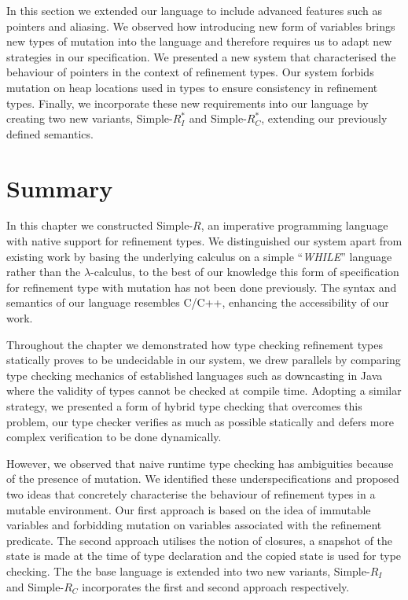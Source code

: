 \documentclass[a4paper,12pt]{report}
\begin{document}
\par
In this section we extended our language to include advanced features such 
as pointers and aliasing. We observed how introducing new form of 
variables brings new types of mutation into the language and therefore 
requires us to adapt new strategies in our specification. We presented  
a new system that characterised the behaviour of pointers in the context of 
refinement types. Our system forbids mutation on heap locations used in types 
to ensure consistency in refinement types. Finally, we incorporate these new requirements 
into our language by creating two new variants, Simple-$R^{*}_{I}$ 
and Simple-$R^{*}_{C}$, extending our previously defined semantics. 

\section{Summary}
In this chapter we constructed Simple-$R$, an imperative programming language with native 
support for refinement types. We distinguished our 
system apart from existing work by basing the underlying calculus 
on a simple ``\textit{WHILE}'' language 
rather than the $\lambda$-calculus, to the best of our knowledge this form of 
specification for refinement type with mutation has not been done 
previously. The syntax and semantics of our 
language resembles C/C++, enhancing the accessibility of our work.

\par
Throughout the chapter we demonstrated how type checking refinement types 
statically proves to be undecidable in our system, we drew parallels by comparing 
type checking mechanics of established languages such as downcasting in Java 
where the validity of types cannot be checked at compile time. 
Adopting a similar strategy, we presented a form of hybrid type checking 
that overcomes this problem, our type checker verifies as much as possible 
statically and defers more complex verification to be done dynamically. 

\par
However, we observed that naive runtime type checking has ambiguities 
because of the presence of mutation. We identified these underspecifications and 
proposed two ideas that concretely characterise the behaviour of refinement 
types in a mutable environment. Our first approach is based on the 
idea of immutable variables and forbidding mutation on variables associated 
with the refinement predicate. The second approach utilises the notion of closures, 
a snapshot of the state is made at the time of type declaration and the copied 
state is used for type checking. The the base language is extended into two 
new variants, Simple-$R_{I}$ and Simple-$R_{C}$ incorporates the first 
and second approach respectively.
\end{document}
